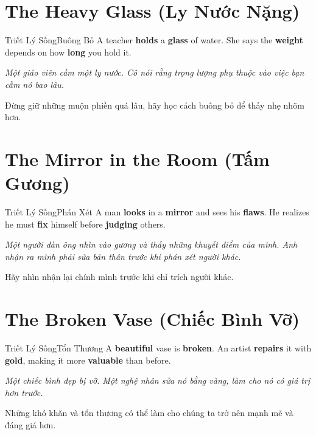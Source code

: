 \section{The Heavy Glass (Ly Nước Nặng)}
\begin{truyen}{Triết Lý Sống}{Buông Bỏ}
A teacher \textbf{holds} a \textbf{glass} of water. She says the \textbf{weight} depends on how \textbf{long} you hold it.

\textit{Một giáo viên cầm một ly nước. Cô nói rằng trọng lượng phụ thuộc vào việc bạn cầm nó bao lâu.}

\begin{baihoc}
Đừng giữ những muộn phiền quá lâu, hãy học cách buông bỏ để thấy nhẹ nhõm hơn.
\end{baihoc}
\end{truyen}

\section{The Mirror in the Room (Tấm Gương)}
\begin{truyen}{Triết Lý Sống}{Phán Xét}
A man \textbf{looks} in a \textbf{mirror} and sees his \textbf{flaws}. He realizes he must \textbf{fix} himself before \textbf{judging} others.

\textit{Một người đàn ông nhìn vào gương và thấy những khuyết điểm của mình. Anh nhận ra mình phải sửa bản thân trước khi phán xét người khác.}

\begin{baihoc}
Hãy nhìn nhận lại chính mình trước khi chỉ trích người khác.
\end{baihoc}
\end{truyen}

\section{The Broken Vase (Chiếc Bình Vỡ)}
\begin{truyen}{Triết Lý Sống}{Tổn Thương}
A \textbf{beautiful} vase is \textbf{broken}. An artist \textbf{repairs} it with \textbf{gold}, making it more \textbf{valuable} than before.

\textit{Một chiếc bình đẹp bị vỡ. Một nghệ nhân sửa nó bằng vàng, làm cho nó có giá trị hơn trước.}

\begin{baihoc}
Những khó khăn và tổn thương có thể làm cho chúng ta trở nên mạnh mẽ và đáng giá hơn.
\end{baihoc}
\end{truyen}

